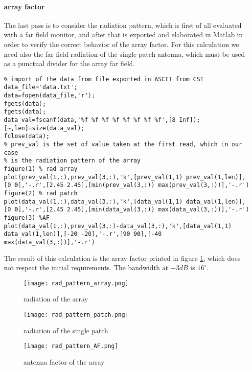 \paragraph{array factor} The last pass is to consider the radiation pattern, which is first of all evaluated with a far field monitor, and after that is exported and elaborated in Matlab in order to verify the correct behavior of the array factor. For this calculation we need also the far field radiation of the single patch antenna, which must be used as a punctual divider for the array far field.
\begin{lstlisting}
% import of the data from file exported in ASCII from CST
data_file='data.txt';
data=fopen(data_file,'r');
fgets(data);
fgets(data);
data_val=fscanf(data,'%f %f %f %f %f %f %f %f',[8 Inf]);
[~,len]=size(data_val);
fclose(data);
% prev_val is the set of value taken at the first read, which in our case
% is the radiation pattern of the array
figure(1) % rad array
plot(prev_val(1,:),prev_val(3,:),'k',[prev_val(1,1) prev_val(1,len)],[0 0],'-.r',[2.45 2.45],[min(prev_val(3,:)) max(prev_val(3,:))],'-.r')
figure(2) % rad patch
plot(data_val(1,:),data_val(3,:),'k',[data_val(1,1) data_val(1,len)],[0 0],'-.r',[2.45 2.45],[min(data_val(3,:)) max(data_val(3,:))],'-.r')
figure(3) %AF
plot(data_val(1,:),prev_val(3,:)-data_val(3,:),'k',[data_val(1,1) data_val(1,len)],[-20 -20],'-.r',[90 90],[-40 max(data_val(3,:))],'-.r')
\end{lstlisting}
The result of this calculation is the array factor printed in figure \ref{rad_pattern_AF}, which does not respect the initial requirements. The bandwidth at $-3dB$ is $16^{\circ}$.
\begin{figure}[H]
	\centering
	\texttt{[image: rad\_pattern\_array.png]}
	\caption{radiation of the array}
\end{figure}
\begin{figure}[H]
	\centering
	\texttt{[image: rad\_pattern\_patch.png]}
	\caption{radiation of the single patch}
\end{figure}
\begin{figure}[H]
	\centering
	\texttt{[image: rad\_pattern\_AF.png]}
	\caption{antenna factor of the array}
	\label{rad_pattern_AF}
\end{figure}